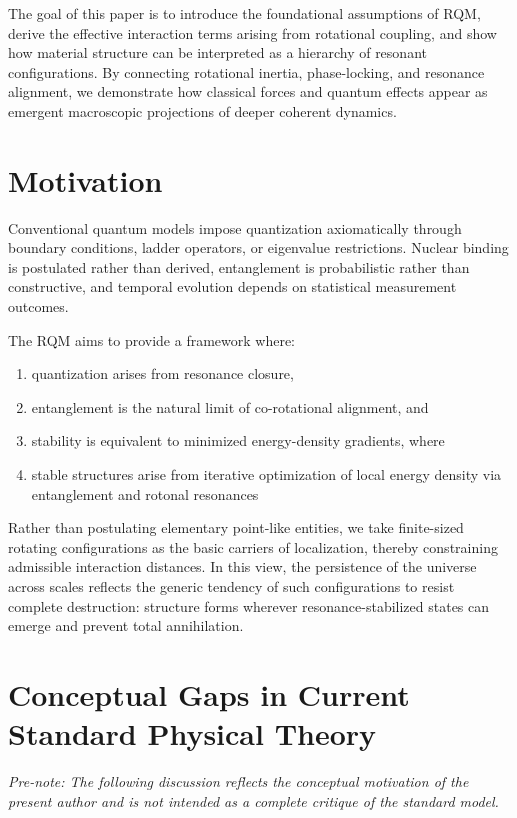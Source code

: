 \documentclass[11pt,a4paper]{article}
\begin{document}
The goal of this paper is to introduce the foundational assumptions of RQM, derive the effective interaction terms arising from rotational coupling, and show how material structure can be interpreted as a hierarchy of resonant configurations. By connecting rotational inertia, phase-locking, and resonance alignment, we demonstrate how classical forces and quantum effects appear as emergent macroscopic projections of deeper coherent dynamics.


\section{Motivation}
Conventional quantum models impose quantization axiomatically through boundary conditions, ladder operators, or eigenvalue restrictions. Nuclear binding is postulated rather than derived, entanglement is probabilistic rather than constructive, and temporal evolution depends on statistical measurement outcomes.

The RQM aims to provide a framework where:
\begin{enumerate}
  \item quantization arises from resonance closure,
  \item entanglement is the natural limit of co-rotational alignment, and
  \item stability is equivalent to minimized energy-density gradients, where
  \item stable structures arise from iterative optimization of local energy density via entanglement and rotonal resonances
\end{enumerate}

Rather than postulating elementary point-like entities, we take finite-sized rotating configurations as the basic carriers of localization, thereby constraining admissible interaction distances. In this view, the persistence of the universe across scales reflects the generic tendency of such configurations to resist complete destruction: structure forms wherever resonance-stabilized states can emerge and prevent total annihilation.

\section{Conceptual Gaps in Current Standard Physical Theory}
\label{sec:conceptual_gaps}

\emph{Pre-note: The following discussion reflects the conceptual motivation of the present author and is not intended as a complete critique of the standard model.}
\end{document}
